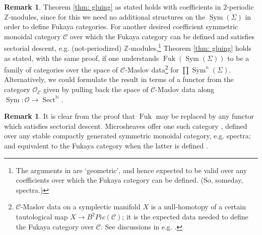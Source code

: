 \documentclass{article}
\def\Z{\mathbb{Z}}
\def\N{\mathbb{N}}
\DeclareMathOperator{\Sect}{Sect}
\DeclareMathOperator{\Sym}{Sym}
\DeclareMathOperator{\Fuk}{Fuk}
\theoremstyle{definition}
\newtheorem{remark}[theorem]{Remark}
\begin{document}
\begin{remark}
    Theorem \ref{thm: gluing} as stated holds with coefficients in 2-periodic $\Z$-modules, since for this we need no additional structures on the $\Sym(\Sigma)$ in order to define Fukaya categories.  For another desired coefficient symmetric monoidal category $\mathcal{C}$ over which  
    the Fukaya category can be defined and satisfies sectorial descent, e.g. (not-periodized) $\Z$-modules,\footnote{The arguments in \cite{GPS2} are `geometric', and hence expected to be valid over any coefficients over which the   Fukaya category can be defined. (So, someday, spectra.)} Theorem \ref{thm: gluing} holds as stated, with the same proof, if one understands $\Fuk(\Sym(\Sigma))$ to be a family of categories over the space of $\mathcal{C}$-Maslov data\footnote{$\mathcal{C}$-Maslov data on a symplectic manifold $X$ is a null-homotopy of a certain tautological map $X \to B^2 Pic (\mathcal{C})$; it is the expected data needed to define the Fukaya category over $\mathcal{C}$.  See discussions in e.g.  \cite{lurie-rotation, nadler-shende, GPS3, CKNS, Gavela-Large-Ward}.} for $\prod \Sym^n (\Sigma)$.  
    Alternatively, we could formulate the result in terms of a functor from the category $\mathscr{O}_{\mathcal{C}}$ given by pulling back the space of $\mathscr{C}$-Maslov data along $\Sym: \mathscr{O} \to \Sect^\N$.   
\end{remark}

\begin{remark}
    It is clear from the proof that $\Fuk$ may be replaced by any functor which satisfies sectorial descent.
    Microsheaves offer one such category \cite{shende-microlocal, nadler-shende}, defined over any stable compactly generated symmetric monoidal category, e.g. spectra; and equivalent to  the Fukaya category when the latter is  defined \cite{GPS3}.
\end{remark}
\end{document}
